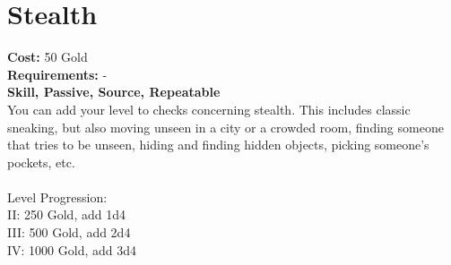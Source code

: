 \section{Stealth}
\textbf{Cost:} 50 Gold\\
\textbf{Requirements:} -\\
\textbf{Skill, Passive, Source, Repeatable}\\
You can add your level to checks concerning stealth. This includes classic sneaking, but also moving unseen in a city or a crowded room, finding someone that tries to be unseen, hiding and finding hidden objects, picking someone's pockets, etc.\\
\\
Level Progression:\\
II: 250 Gold, add 1d4\\
III: 500 Gold, add 2d4\\
IV: 1000 Gold, add 3d4\\